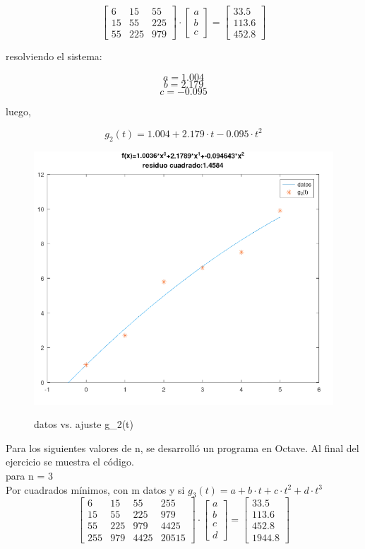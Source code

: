 \documentclass{article}
\begin{document}
\[
\begin{bmatrix}
    6 & 15 & 55 \\
    15 & 55 & 225 \\
    55 & 225 & 979
\end{bmatrix}
\cdot
\begin{bmatrix}
    a \\ b \\ c
\end{bmatrix}
=
\begin{bmatrix}
    33.5 \\
    113.6\\
    452.8
\end{bmatrix}
\]

resolviendo el sistema:

\[
a = 1.004
\]
\[
b = 2.179
\]
\[
c = -0.095
\]

luego,

\[g_2(t)=1.004 + 2.179 \cdot t -0.095 \cdot t^2\]

\begin{figure}[H]
    \centering
    \includegraphics[width=0.6\linewidth]{grado.2.png}
    \label{fig:enter-label}
    \caption{datos vs. ajuste g_2(t)}
\end{figure}

Para los siguientes valores de n, se desarrolló un programa en Octave. Al final del ejercicio se muestra el código.\\

para n = 3\\

Por cuadrados mínimos, con m datos y si 
$g_3(t)=a + b \cdot t + c \cdot t^2 + d \cdot t^3$\\

\[
\begin{bmatrix}
    6 & 15 & 55 & 255\\
    15 & 55 & 225 & 979 \\
    55 & 225 & 979 & 4425\\
    255 & 979 & 4425 & 20515
\end{bmatrix}
\cdot
\begin{bmatrix}
    a \\ b \\ c \\ d
\end{bmatrix}
=
\begin{bmatrix}
    33.5 \\
    113.6 \\
    452.8 \\
    1944.8
\end{bmatrix}
\]
\end{document}
